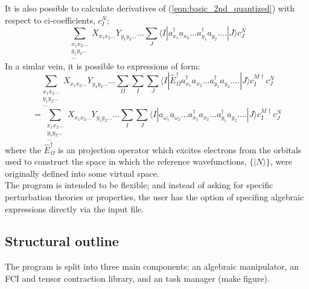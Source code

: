 \documentclass[12pt]{article}
\begin{document}
\noindent It is also possible to calculate derivatives of (\ref{eqn:basic_2nd_quantized})  with respect to ci-coefficients, $c_{I}^{N}$;
 \begin{equation}
\sum_{\substack{ x_{1}x_{2}...\\ y_{1}y_{2}... \\ ...}} X_{x_{1}x_{2}...} Y_{y_{1}y_{2}...} ...
\sum_{J}
\langle I | a^{\dagger}_{x_{1}} a_{x_{2}}...a^{\dagger}_{y_{1}}a_{y_{2}}....| J \rangle 
c^{N}_{J}
\label{eqn:ci_derivative}
\end{equation}
 \noindent In a simlar vein, it is possible to expressions of form:
\begin{equation*}
\sum_{\substack{ x_{1}x_{2}...\\ y_{1}y_{2}... \\ ...}} X_{x_{1}x_{2}...} Y_{y_{1}y_{2}...} ...
\sum_{\Omega}
\sum_{I}\sum_{J}
\langle I | \hat{E}^{\dagger}_{\Omega} a^{\dagger}_{x_{1}} a_{x_{2}}...a^{\dagger}_{y_{1}}a_{y_{2}}....| J \rangle 
 c^{M \dagger}_{I}c^{N}_{J}
\end{equation*}
\begin{equation}
=
\sum_{\substack{ x_{1}x_{2}...\\ y_{1}y_{2}... \\ ...}} X_{x_{1}x_{2}...} Y_{y_{1}y_{2}...} ...
\sum_{I}\sum_{J}
\langle I | a_{\omega_{1}} a_{\omega_{2}}.. .a^{\dagger}_{x_{1}} a_{x_{2}}...a^{\dagger}_{y_{1}}a_{y_{2}}....| J \rangle 
 c^{M \dagger}_{I}c^{N}_{J}
\label{eqn:basic_2nd_quantized_projector}
\end{equation}
 \noindent where the $\hat{E}^{\dagger}_{\Omega}$ is an projection operator
which excites electrons from the orbitals used to construct the space in which
the reference wavefunctions, $\{|N\rangle\}$, were originally defined into some
virtual space.\\

\noindent The program is intended to be flexible; and instead of asking for
specific perturbation theories or properties, the user has the option of
specifing algebraic expressions directly via the input file.


\subsection{Structural outline}
\noindent The program is split into three main components; an algebraic manipulator, an FCI
and tensor contraction library, and an task manager (make figure).\\
\end{document}
